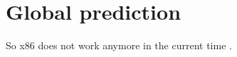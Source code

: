 \chapter{Global prediction}
\label{sec:intro}
So x86 does not work anymore in the current time \cite{camilo2015bugs}.
\lipsum[4]
